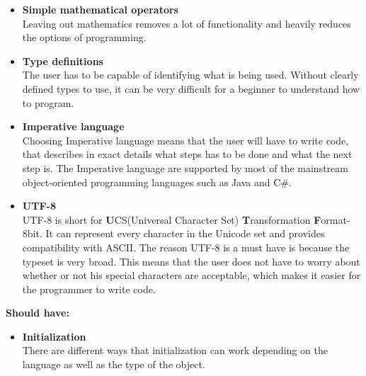 \begin{itemize}
\item \textbf{Simple mathematical operators} \\
Leaving out mathematics removes a lot of functionality and heavily reduces the options of programming. \\

\item \textbf{Type definitions} \\
The user has to be capable of identifying what is being used. Without clearly defined types to use, it can be very difficult for a beginner to understand how to program. \\

\item \textbf{Imperative language} \\
Choosing Imperative language means that the user will have to write code, that describes in exact details what steps has to be done and what the next step is. The Imperative language are supported by most of the mainstream object-oriented programming languages such as Java and C\#. \cite{Impr} \\

\item \textbf{UTF-8} \\
UTF-8 is short for \textbf{U}CS(Universal Character Set) \textbf{T}ransformation \textbf{F}ormat-8bit. It can represent every character in the Unicode set and provides compatibility with ASCII. 
The reason UTF-8 is a must have is because the typeset is very broad. This means that the user does not have to worry about whether or not his special characters are acceptable, which makes it easier for the programmer to write code.\\
\end{itemize}

\textbf{Should have:}
\begin{itemize}
\item \textbf{Initialization} \\
There are different ways that initialization can work depending on the language as well as the type of the object. \\
\end{itemize}

